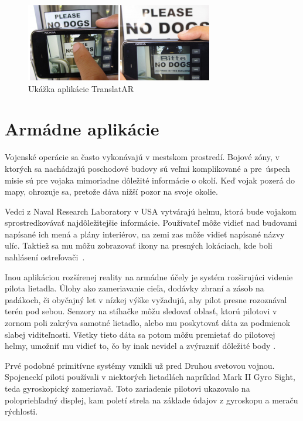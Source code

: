 \begin{figure}[h]
 \centering
 \includegraphics[max width=\textwidth]{pictures/translatar.png}
 \caption{Ukážka aplikácie TranslatAR \cite{Fragoso11}}
 \label{translatar}
 \end{figure}

\section{Armádne aplikácie}

Vojenské operácie sa často vykonávajú v mestskom prostredí. Bojové zóny, v ktorých sa nachádzajú poschodové budovy sú veľmi komplikované a pre~úspech misie sú pre vojaka mimoriadne dôležité informácie o okolí. Keď vojak pozerá do mapy, ohrozuje sa, pretože dáva nižší pozor na svoje okolie.

Vedci z Naval Research Laboratory v USA vytvárajú helmu, ktorá bude vojakom sprostredkovávať najdôležitejšie informácie. Používateľ môže vidieť nad budovami napísané ich mená a plány interiérov, na zemi zas môže vidieť napísané názvy ulíc. Taktiež sa mu môžu zobrazovať ikony na presných lokáciach, kde boli nahlásení ostreľovači~\cite{Livingston02, Julier00}.

Inou aplikáciou rozšírenej reality na armádne účely je systém rozširujúci videnie pilota lietadla. Úlohy ako zameriavanie cieľa, dodávky zbraní a zásob na padákoch, či obyčajný let v nízkej výške vyžadujú, aby pilot presne rozoznával terén pod sebou. Senzory na stíhačke môžu sledovať oblasť, ktorú pilotovi v zornom poli zakrýva samotné lietadlo, alebo mu poskytovať dáta za podmienok slabej viditeľnosti. Všetky tieto dáta sa potom môžu premietať do pilotovej helmy, umožniť mu vidieť to, čo by inak nevidel a zvýrazniť dôležité body \cite{Livingston11}.

Prvé podobné primitívne systémy vznikli už pred Druhou svetovou vojnou. Spojeneckí piloti používali v niektorých lietadlách napríklad Mark II Gyro Sight, teda gyroskopický zameriavač. Toto zariadenie pilotovi ukazovalo na polopriehľadný displej, kam poletí strela na základe údajov z gyroskopu a meraču rýchlosti.

